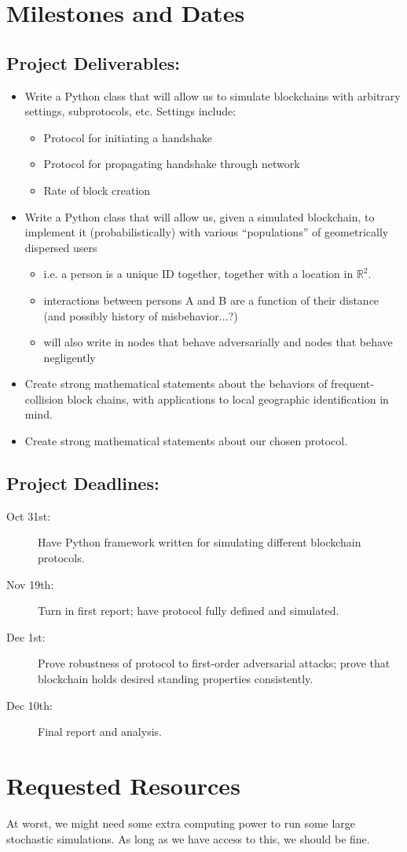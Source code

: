 \documentclass{article}
\begin{document}
\section*{Milestones and Dates}
\subsection*{Project Deliverables:}
\begin{itemize}
	\item Write a Python class that will allow us to simulate
		blockchains with arbitrary settings, subprotocols, etc.
		Settings include:
	\begin{itemize}
		\item Protocol for initiating a handshake
		\item Protocol for propagating handshake through network
		\item Rate of block creation
	\end{itemize}
	\item Write a Python class that will allow us, given a simulated
		blockchain, to implement it (probabilistically) with
		various ``populations'' of geometrically dispersed users
	\begin{itemize}
		\item i.e. a person is a unique ID together,
			together with a location in $\mathbb{R}^2$.
		\item interactions between persons A and B are
			a function of their distance (and possibly
			history of misbehavior...?)
		\item will also write in nodes that behave adversarially
			and nodes that behave negligently
	\end{itemize}
	\item Create strong mathematical statements about
		the behaviors of frequent-collision block chains,
		with applications to local geographic identification
		in mind.
	\item Create strong mathematical statements about our chosen
		protocol.
\end{itemize}

\subsection*{Project Deadlines:}
\begin{description}
	\item[Oct 31st:] Have Python framework written for simulating different
		blockchain protocols.
	\item[Nov 19th:] Turn in first report; have protocol fully defined and
		simulated.
	\item[Dec 1st:] Prove robustness of protocol to first-order adversarial
		attacks; prove that blockchain holds desired standing properties
		consistently.
	\item[Dec 10th:] Final report and analysis.
\end{description}

\section*{Requested Resources}
At worst, we might need some extra computing power to run some large stochastic
simulations. As long as we have access to this, we should be fine.

\printbibliography[title={Bibliography}] %
\end{document}
